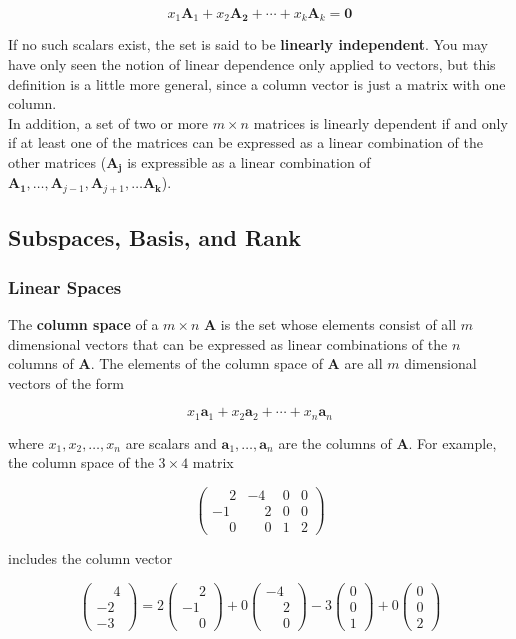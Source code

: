 \documentclass[11pt]{article}
\theoremstyle{definition}
\begin{document}
\[x_1\mathbf{A}_1 + x_2\mathbf{A_2} + \cdots + x_k\mathbf{A}_k = \mathbf{0}\]

If no such scalars exist, the set is said to be \textbf{linearly independent}.  You may have only seen the notion of linear dependence only applied to vectors, but this definition is a little more general, since a column vector is just a matrix with one column.\\

In addition, a set of two or more $m \times n$ matrices is linearly dependent if and only if at least one of the matrices can be expressed as a linear combination of the other matrices ($\mathbf{A_j}$ is expressible as a linear combination of $\mathbf{A_1}, \hdots, \mathbf{A}_{j-1}, \mathbf{A}_{j+1}, \hdots \mathbf{A_k}$).


\subsection{Subspaces, Basis, and Rank}
\subsubsection{Linear Spaces}
The \textbf{column space} of a $m \times n$ $\mathbf{A}$ is the set whose elements consist of all $m$ dimensional vectors that can be expressed as linear combinations of the $n$ columns of $\mathbf{A}$.  The elements of the column space of $\mathbf{A}$ are all $m$ dimensional vectors of the form

\[x_1 \mathbf{a}_1 + x_2\mathbf{a}_2 + \cdots + 
x_n\mathbf{a}_n\]

where $x_1, x_2, \hdots, x_n$ are scalars and $\mathbf{a}_1, \hdots, \mathbf{a}_n$ are the columns of $\mathbf{A}$.  For example, the column space of the $3 \times 4$ matrix

\[\begin{pmatrix}
\phantom{-}2 & -4 & 0 & 0\\
-1 & \phantom{-}2 & 0 & 0\\
\phantom{-}0 & \phantom{-}0 & 1 & 2
\end{pmatrix}\]

includes the column vector

\[
\begin{pmatrix}
\phantom{-}4\\
-2\\
-3
\end{pmatrix}
=
2\begin{pmatrix}
\phantom{-}2\\
-1\\
\phantom{-}0
\end{pmatrix}
+
0\begin{pmatrix}
-4\\
\phantom{-}2\\
\phantom{-}0
\end{pmatrix}
-
3\begin{pmatrix}
0\\
0\\
1
\end{pmatrix}
+
0\begin{pmatrix}
0\\
0\\
2
\end{pmatrix}
\]
\end{document}
